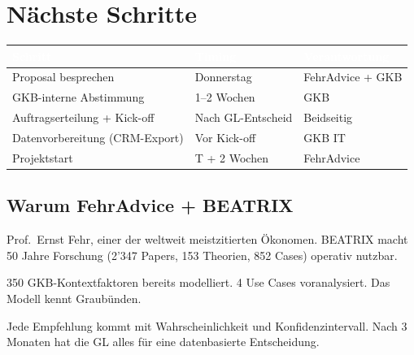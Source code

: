 \documentclass[11pt,a4paper]{article}
\newcommand{\headerrow}{\rowcolor{fadarkblue}}
\newcommand{\altrow}{\rowcolor{falightgray}}
\begin{document}

\section{Nächste Schritte}

\begin{center}
\begin{tabularx}{\textwidth}{X l l}
\toprule
\headerrow \textcolor{white}{\textbf{Schritt}} & \textcolor{white}{\textbf{Timing}} & \textcolor{white}{\textbf{Verantwortung}} \\
\midrule
Proposal besprechen & Donnerstag & FehrAdvice + GKB \\
\altrow GKB-interne Abstimmung & 1--2 Wochen & GKB \\
Auftragserteilung + Kick-off & Nach GL-Entscheid & Beidseitig \\
\altrow Datenvorbereitung (CRM-Export) & Vor Kick-off & GKB IT \\
Projektstart & T + 2 Wochen & FehrAdvice \\
\bottomrule
\end{tabularx}
\end{center}

\vspace{0.5cm}

\subsection{Warum FehrAdvice + BEATRIX}

\begin{fahighlight}
\begin{description}[leftmargin=0.5cm, style=nextline]
\item[\textcolor{fadarkblue}{Wissenschaft + Technologie}] Prof.\ Ernst Fehr, einer der weltweit meistzitierten Ökonomen. BEATRIX macht 50 Jahre Forschung (2'347 Papers, 153 Theorien, 852 Cases) operativ nutzbar.

\item[\textcolor{fadarkblue}{Graubünden-Expertise}] 350 GKB-Kontextfaktoren bereits modelliert. 4 Use Cases voranalysiert. Das Modell kennt Graubünden.

\item[\textcolor{fadarkblue}{Messbare Ergebnisse}] Jede Empfehlung kommt mit Wahrscheinlichkeit und Konfidenzintervall. Nach 3 Monaten hat die GL alles für eine datenbasierte Entscheidung.
\end{description}
\end{fahighlight}
\end{document}
